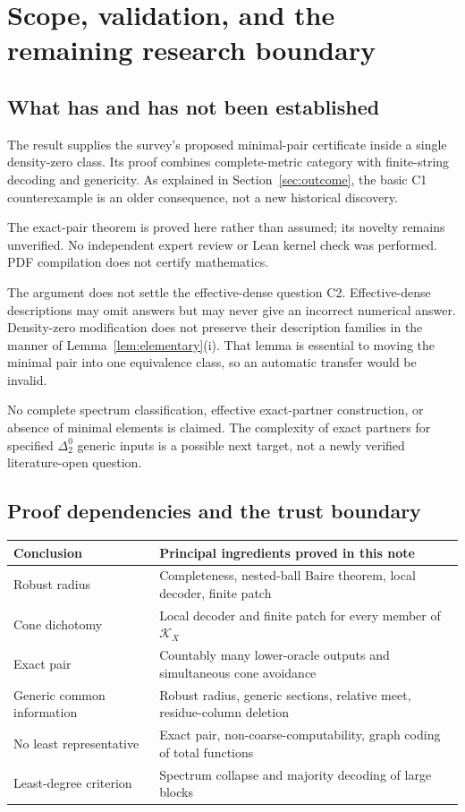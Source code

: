\documentclass[11pt,a4paper]{article}
\theoremstyle{definition}\newtheorem{definition}[theorem]{Definition}
\theoremstyle{remark}\newtheorem{remark}[theorem]{Remark}
\begin{document}
\clearpage
\section{Scope, validation, and the remaining research boundary}
\label{sec:scope}
\subsection{What has and has not been established}
The result supplies the survey's proposed minimal-pair certificate inside a single density-zero class. Its proof combines complete-metric category with finite-string decoding and genericity. As explained in Section~\ref{sec:outcome}, the basic C1 counterexample is an older consequence, not a new historical discovery.

The exact-pair theorem is proved here rather than assumed; its novelty remains unverified. No independent expert review or Lean kernel check was performed. PDF compilation does not certify mathematics.

The argument does not settle the effective-dense question C2. Effective-dense descriptions may omit answers but may never give an incorrect numerical answer. Density-zero modification does not preserve their description families in the manner of Lemma~\ref{lem:elementary}(i). That lemma is essential to moving the minimal pair into one equivalence class, so an automatic transfer would be invalid.

No complete spectrum classification, effective exact-partner construction, or absence of minimal elements is claimed. The complexity of exact partners for specified $\Delta^0_2$ generic inputs is a possible next target, not a newly verified literature-open question.

\subsection{Proof dependencies and the trust boundary}
\begin{center}
\small
\begin{tabularx}{\textwidth}{@{}p{}X@{}}
\toprule
Conclusion & Principal ingredients proved in this note \\
\midrule
Robust radius & Completeness, nested-ball Baire theorem, local decoder, finite patch \\
Cone dichotomy & Local decoder and finite patch for every member of $\mathcal K_X$ \\
Exact pair & Countably many lower-oracle outputs and simultaneous cone avoidance \\
Generic common information & Robust radius, generic sections, relative meet, residue-column deletion \\
No least representative & Exact pair, non-coarse-computability, graph coding of total functions \\
Least-degree criterion & Spectrum collapse and majority decoding of large blocks \\
\bottomrule
\end{tabularx}
\end{center}
\end{document}

